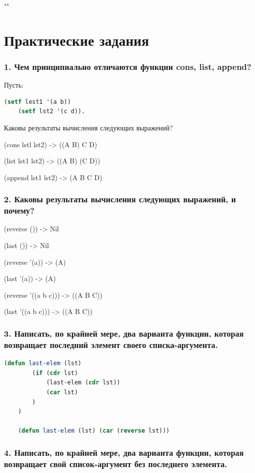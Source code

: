 \documentclass[12pt]{report}
\begin{document}
""\newline
\chapter*{Практические задания}

\subsection*{1. Чем принципиально отличаются функции cons, list, append?}

Пусть:
\begin{lstlisting}[label=6xd, language=lisp]
 	(setf lest1 '(a b)) 
	(setf lst2 '(c d)).
\end{lstlisting}	
Каковы результаты вычисления следующих выражений?

(cons lstl lst2) -> ((A B) C D)

(list lst1 lst2) -> ((A B) (C D))

(append lst1 lst2) -> (A B C D)


\subsection*{2. Каковы результаты вычисления следующих выражений, и почему?}

(reverse ()) -> Nil

(last ()) -> Nil

(reverse '(a)) -> (A)

(last '(a)) -> (A)

(reverse '((a b c))) -> ((A B C))

(last '((a b c))) -> ((A B C))

\subsection*{3. Написать, по крайней мере, два варианта функции, которая возвращает последний элемент
	своего списка-аргумента.}

\begin{lstlisting}[label=6xd, caption=Решение задания №3, language=lisp]
	(defun last-elem (lst) 
		(if (cdr lst) 
			(last-elem (cdr lst)) 
			(car lst)
		)
	)
	
	(defun last-elem (lst) (car (reverse lst)))

\end{lstlisting}

\subsection*{4. Написать, по крайней мере, два варианта функции, которая возвращает свой список-аргумент без последнего элемента.}
\end{document}
